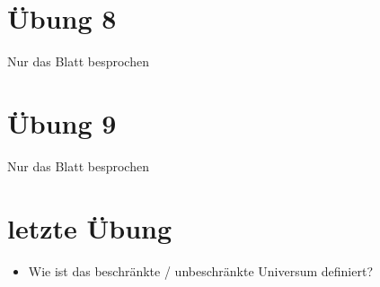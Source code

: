 \documentclass[12pt, a4paper]{article}
\begin{document}
\section*{Übung 8}

Nur das Blatt besprochen

\section*{Übung 9}

Nur das Blatt besprochen


\section*{letzte Übung}
 
\begin{itemize}
\item Wie ist das beschränkte / unbeschränkte Universum definiert?
\end{itemize}
\end{document}
